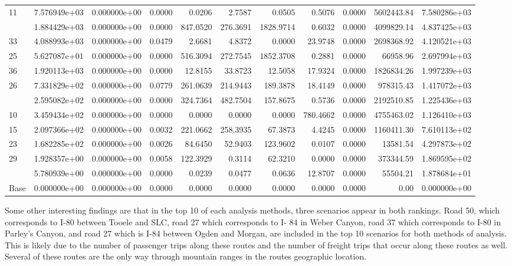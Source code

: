 \begin{table}
\begin{tabular}[t]{lrrrrrrrrrr}
11 & 7.576949e+03 & 0.000000e+00 & 0.0000 & 0.0206 & 2.7587 & 0.0505 & 0.5076 & 0.0000 & 5602443.84 & 7.580286e+03\\
\addlinespace
24 & 1.884429e+03 & 0.000000e+00 & 0.0000 & 847.0520 & 276.3691 & 1828.9714 & 0.6032 & 0.0000 & 4099829.14 & 4.837425e+03\\
33 & 4.088993e+03 & 0.000000e+00 & 0.0479 & 2.6681 & 4.8372 & 0.0000 & 23.9748 & 0.0000 & 2698368.92 & 4.120521e+03\\
25 & 5.627087e+01 & 0.000000e+00 & 0.0000 & 516.3094 & 272.7545 & 1852.3708 & 0.2881 & 0.0000 & 66958.96 & 2.697994e+03\\
36 & 1.920113e+03 & 0.000000e+00 & 0.0000 & 12.8155 & 33.8723 & 12.5058 & 17.9324 & 0.0000 & 1826834.26 & 1.997239e+03\\
26 & 7.331829e+02 & 0.000000e+00 & 0.0779 & 261.0639 & 214.9443 & 189.3878 & 18.4149 & 0.0000 & 978315.43 & 1.417072e+03\\
\addlinespace
31 & 2.595082e+02 & 0.000000e+00 & 0.0000 & 324.7364 & 482.7504 & 157.8675 & 0.5736 & 0.0000 & 2192510.85 & 1.225436e+03\\
10 & 3.459434e+02 & 0.000000e+00 & 0.0000 & 0.0000 & 0.0000 & 0.0000 & 780.4662 & 0.0000 & 4755463.02 & 1.126410e+03\\
15 & 2.097366e+02 & 0.000000e+00 & 0.0032 & 221.0662 & 258.3935 & 67.3873 & 4.4245 & 0.0000 & 1160411.30 & 7.610113e+02\\
23 & 1.682285e+02 & 0.000000e+00 & 0.0026 & 84.6450 & 52.9403 & 123.9602 & 0.0107 & 0.0000 & 13581.54 & 4.297873e+02\\
29 & 1.928357e+00 & 0.000000e+00 & 0.0058 & 122.3929 & 0.3114 & 62.3210 & 0.0000 & 0.0000 & 373344.59 & 1.869595e+02\\
\addlinespace
28 & 5.780939e+00 & 0.000000e+00 & 0.0000 & 0.0239 & 0.0477 & 0.0636 & 12.8707 & 0.0000 & 55504.21 & 1.878684e+01\\
Base & 0.000000e+00 & 0.000000e+00 & 0.0000 & 0.0000 & 0.0000 & 0.0000 & 0.0000 & 0.0000 & 0.00 & 0.000000e+00\\
\bottomrule
\end{tabular}
\end{table}

Some other interesting findings are that in the top 10 of each analysis
methods, three scenarios appear in both rankings. Road 50, which
corresponds to I-80 between Tooele and SLC, road 27 which corresponds to I-
84 in Weber Canyon, road 37 which corresponds to I-80 in Parley’s Canyon,
and road 27 which is I-84 between Ogden and Morgan, are included in the
top 10 scenarios for both methods of analysis. This is likely due to the
number of passenger trips along these routes and the number of freight
trips that occur along these routes as well. Several of these routes are
the only way through mountain ranges in the routes geographic location.

